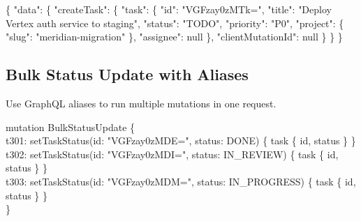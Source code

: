 \vspace{4pt}

\begin{responsebox}[title=Response]
\{ "data": \{ "createTask": \{ "task": \{ "id": "VGFzay0zMTk=", "title": "Deploy Vertex auth service to staging", "status": "TODO", "priority": "P0", "project": \{ "slug": "meridian-migration" \}, "assignee": null \}, "clientMutationId": null \} \} \}
\end{responsebox}

\subsection*{Bulk Status Update with Aliases}

Use GraphQL aliases to run multiple mutations in one request.

\vspace{2pt}
\begin{querybox}[title=Mutation: Bulk Status Update via Aliases]
mutation BulkStatusUpdate \{\\
\quad t301: setTaskStatus(id: "VGFzay0zMDE=", status: DONE)       \{ task \{ id, status \} \}\\
\quad t302: setTaskStatus(id: "VGFzay0zMDI=", status: IN\_REVIEW)  \{ task \{ id, status \} \}\\
\quad t303: setTaskStatus(id: "VGFzay0zMDM=", status: IN\_PROGRESS) \{ task \{ id, status \} \}\\
\}
\end{querybox}
